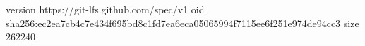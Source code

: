 version https://git-lfs.github.com/spec/v1
oid sha256:ec2ea7cb4c7e434f695bd8c1fd7ea6eca05065994f7115ee6f251e974de94cc3
size 262240
